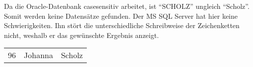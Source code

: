           Da die Oracle-Datenbank casesensitiv arbeitet, ist \enquote{SCHOLZ} ungleich \enquote{Scholz}. Somit werden keine Datens\"atze gefunden. Der MS SQL Server hat hier keine Schwierigkeiten. Ihn st\"ort die unterschiedliche Schreibweise der Zeichenketten nicht, weshalb er das gew\"unschte Ergebnis anzeigt.
\clearpage
          \begin{center}
            \begin{small}
              \tablehead{}
              \begin{mssql}
                \begin{supertabular}{rll}
                  96 & Johanna & Scholz \\
                \end{supertabular}
              \end{mssql}
            \end{small}
          \end{center}
